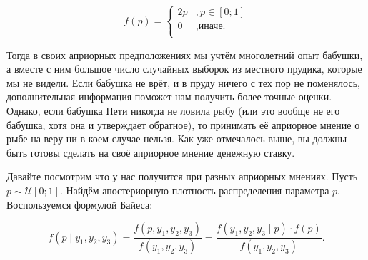 \documentclass[12pt, a4paper, oneside]{extreport}
\def \mU{\mathcal{U}}
\theoremstyle{plain}              %
\theoremstyle{definition}         %
\begin{document}
\begin{figure}[H]
\begin{minipage}[H]{0.39\linewidth}
\begin{center}
\[ f(p) = \begin{cases}
            2p&, p \in [0;1] \\
             0&, \text{иначе.}\\
            \end{cases} \]
\end{center}
\end{minipage}
\hfill
\begin{minipage}[H]{0.59\linewidth}
\begin{center}
\end{center}
\end{minipage}
\end{figure}


Тогда в своих априорных предположениях мы учтём многолетний опыт бабушки, а вместе с ним большое число случайных выборок из местного прудика, которые мы не видели. Если бабушка не врёт, и в пруду ничего с тех пор не поменялось, дополнительная информация поможет нам получить более точные оценки. Однако, если бабушка Пети никогда не ловила рыбу (или это вообще не его бабушка, хотя она и утверждает обратное), то принимать её априорное мнение о рыбе на веру ни в коем случае нельзя. Как уже отмечалось выше, вы должны быть готовы сделать на своё априорное мнение денежную ставку. 

Давайте посмотрим что у нас получится при разных априорных мнениях. Пусть $p \sim \mU[0;1]$. Найдём апостериорную плотность распределения параметра $p$. Воспользуемся формулой Байеса:

\[ f(p \mid y_1,y_2,y_3) = \frac{f(p,y_1,y_2,y_3)}{f(y_1,y_2,y_3)} = \frac{f(y_1,y_2,y_3 \mid p) \cdot f(p)}{f(y_1,y_2,y_3)}.\]
\end{document}
